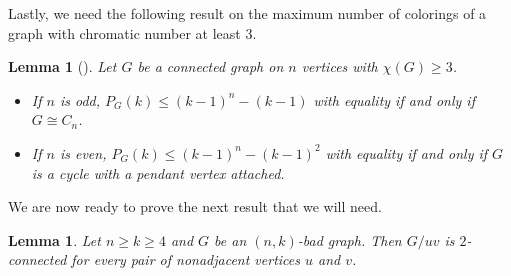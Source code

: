 \documentclass[11pt]{article}
\theoremstyle{plain}
\newtheorem{lemma}[theorem]{Lemma}
\theoremstyle{definition}
\theoremstyle{remark}
\begin{document}
Lastly, we need the following result on the maximum number of colorings of a graph with chromatic number at least $3$.

\begin{lemma}[\cite{To90}]\label{3chrom} Let $G$ be a connected graph on $n$ vertices with $\chi(G)\geq 3$.
\begin{itemize}
\item If $n$  is odd, $P_G(k)\leq (k-1)^n-(k-1)$ with equality if and only if $G\cong C_n$.
\item If $n$ is even, $P_G(k)\leq (k-1)^n-(k-1)^2$ with equality if and only if $G$ is a cycle with a pendant vertex attached.
\end{itemize}
\end{lemma}

We are now ready to prove the next result that we will need.

\begin{lemma}\label{cont2conn} Let $n\geq k\geq 4$ and $G$ be an $(n,k)$-bad graph. Then $G/uv$ is $2$-connected for every pair of nonadjacent vertices $u$ and $v$.
\end{lemma}
\end{document}
